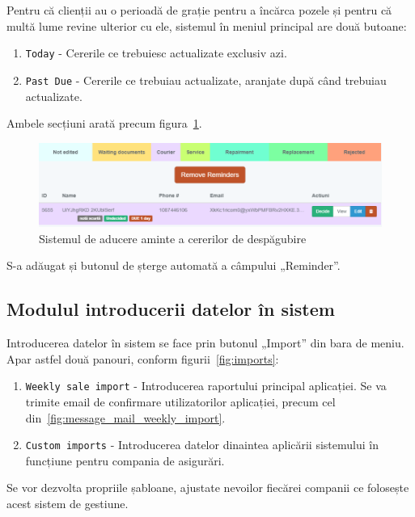 		Pentru că clienții au o perioadă de grație pentru a încărca pozele și pentru că multă lume revine ulterior cu ele, sistemul în meniul principal are două butoane:
		\begin{enumerate}
			\item \verb|Today| - Cererile ce trebuiesc actualizate exclusiv azi.
			\item \verb|Past Due| - Cererile ce trebuiau actualizate, aranjate după când trebuiau actualizate.
		\end{enumerate}
		Ambele secțiuni arată precum figura~\ref{fig:claims_reminders}.
		\begin{figure}
			\includegraphics[width=\linewidth]{../imagini/claims_reminder_view.png}
			\caption{Sistemul de aducere aminte a cererilor de despăgubire}
			\label{fig:claims_reminders}
		\end{figure}
		S-a adăugat și butonul de șterge automată a câmpului  „Reminder”.

	\subsection{Modulul introducerii datelor în sistem}

		Introducerea datelor în sistem se face prin butonul „Import” din bara de meniu.
		Apar astfel două panouri, conform figurii~\ref{fig:imports}:
		\begin{enumerate}
			\item \verb|Weekly sale import| - Introducerea raportului principal aplicației. Se va trimite email de confirmare utilizatorilor aplicației, precum cel din~\ref{fig:message_mail_weekly_import}.
			\item \verb|Custom imports| - Introducerea datelor dinaintea aplicării sistemului în funcțiune pentru compania de asigurări.
		\end{enumerate}

		Se vor dezvolta propriile șabloane, ajustate nevoilor fiecărei companii ce folosește acest sistem de gestiune.

